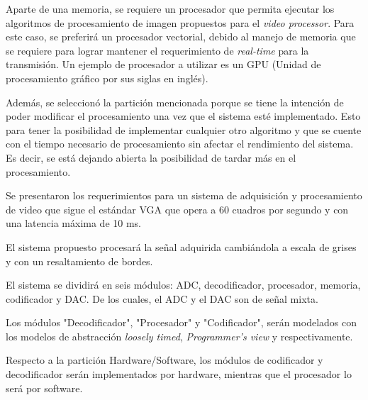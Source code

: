 \documentclass[10pt, letterpaper, conference]{IEEEtran}
\begin{document}
Aparte de una memoria, se requiere un procesador que permita ejecutar los
algoritmos de procesamiento de imagen propuestos para el 
\emph{video processor}. Para este caso, se preferir\'a un procesador 
vectorial, debido al manejo de memoria que se requiere para lograr mantener
el requerimiento de \emph{real-time} para la transmisi\'on. Un ejemplo de 
procesador a utilizar es un GPU (Unidad de procesamiento gr\'afico por sus
siglas en ingl\'es).

Adem\'as, se seleccion\'o la partici\'on mencionada porque se tiene la intenci\'on
de poder modificar el procesamiento una vez que el sistema est\'e implementado. 
Esto para tener la posibilidad de implementar cualquier otro algoritmo y que se 
cuente con el tiempo necesario de procesamiento sin afectar el rendimiento 
del sistema. Es decir, se est\'a dejando abierta la posibilidad de tardar 
m\'as en el procesamiento.


Se presentaron los requerimientos para un sistema de adquisici\'on y procesamiento
de video que sigue el est\'andar VGA que opera a 60 cuadros por segundo y con una
latencia m\'axima de 10 ms.

El sistema propuesto procesar\'a la se\~nal adquirida cambi\'andola a escala de
grises y con un resaltamiento de bordes.

El sistema se dividir\'a en seis m\'odulos: ADC, decodificador, procesador, memoria,
codificador y DAC. De los cuales, el ADC y el DAC son de se\~nal mixta.

Los m\'odulos "Decodificador", "Procesador" y "Codificador", ser\'an modelados con los 
modelos de abstracci\'on \textit{loosely timed}, \textit{Programmer's view} y 
 respectivamente.

Respecto a la partici\'on Hardware/Software, los m\'odulos de codificador y 
decodificador ser\'an implementados por hardware, mientras que el procesador lo 
ser\'a por software.


 

\end{document}
